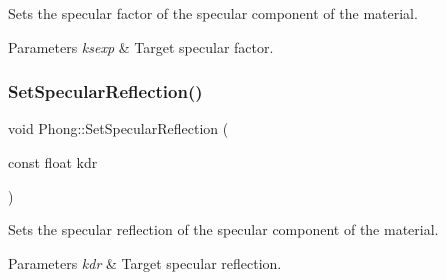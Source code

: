 Sets the specular factor of the specular component of the material. 
\begin{DoxyParams}{Parameters}
{\em ksexp} & Target specular factor. \\
\hline
\end{DoxyParams}
\hypertarget{group___materials_gaaa0823035fefb08e6f20e4af9c6f73d2}{}\label{group___materials_gaaa0823035fefb08e6f20e4af9c6f73d2} 
\subsubsection{\texorpdfstring{Set\+Specular\+Reflection()}{SetSpecularReflection()}}
{\footnotesize\ttfamily void Phong\+::\+Set\+Specular\+Reflection (\begin{DoxyParamCaption}\item[{const float}]{kdr }\end{DoxyParamCaption})\hspace{0.3cm}{\ttfamily [inline]}}

Sets the specular reflection of the specular component of the material. 
\begin{DoxyParams}{Parameters}
{\em kdr} & Target specular reflection. \\
\hline
\end{DoxyParams}
